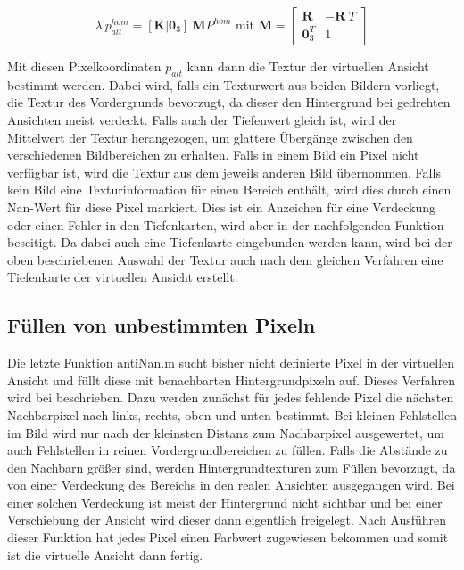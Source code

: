 \begin{equation}
\label{eq:3Dconstback}
\lambda \: p_{alt}^{hom} = [\boldsymbol{K} | \boldsymbol{0}_3] \:  \boldsymbol{M} P^{hom} 
\text{ mit } \boldsymbol{M} = 
 \begin{bmatrix}
\boldsymbol{R} & -\boldsymbol{R} \: T \\
\boldsymbol{0}_3^T & 1 
\end{bmatrix}
\end{equation}

Mit diesen Pixelkoordinaten $p_{alt}$ kann dann die Textur der virtuellen Ansicht bestimmt werden. Dabei wird, falls ein Texturwert aus beiden Bildern vorliegt, die Textur des Vordergrunds bevorzugt, da dieser den Hintergrund bei gedrehten Ansichten meist verdeckt. Falls auch der Tiefenwert gleich ist, wird der Mittelwert der Textur herangezogen, um glattere Übergänge zwischen den verschiedenen Bildbereichen zu erhalten. Falls in einem Bild ein Pixel nicht verfügbar ist, wird die Textur aus dem jeweils anderen Bild übernommen. Falls kein Bild eine Texturinformation für einen Bereich enthält, wird dies durch einen Nan-Wert für diese Pixel markiert. Dies ist ein Anzeichen für eine Verdeckung oder einen Fehler in den Tiefenkarten, wird aber in der nachfolgenden Funktion beseitigt. Da dabei auch eine Tiefenkarte eingebunden werden kann, wird bei der oben beschriebenen Auswahl der Textur auch nach dem gleichen Verfahren eine Tiefenkarte der virtuellen Ansicht erstellt.

\subsection{Füllen von unbestimmten Pixeln}
\label{antiNan}

Die letzte Funktion \mbox{\glqq antiNan.m\grqq{}} sucht bisher nicht definierte Pixel in der virtuellen Ansicht und füllt diese mit benachbarten Hintergrundpixeln auf. Dieses Verfahren wird bei \cite{Zinger} beschrieben. Dazu werden zunächst für jedes fehlende Pixel die nächsten Nachbarpixel nach links, rechts, oben und unten bestimmt. Bei kleinen Fehlstellen im Bild wird nur nach der kleinsten Distanz zum Nachbarpixel ausgewertet, um auch Fehlstellen in reinen Vordergrundbereichen zu füllen. Falls die Abstände zu den Nachbarn größer sind, werden Hintergrundtexturen zum Füllen bevorzugt, da von einer Verdeckung des Bereichs in den realen Ansichten ausgegangen wird. Bei einer solchen Verdeckung ist meist der Hintergrund nicht sichtbar und bei einer Verschiebung der Ansicht wird dieser dann eigentlich freigelegt. Nach Ausführen dieser Funktion hat jedes Pixel einen Farbwert zugewiesen bekommen und somit ist die virtuelle Ansicht dann fertig.















